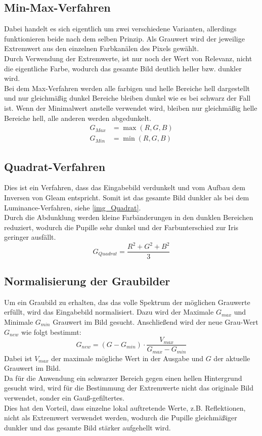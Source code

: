 \subsection{Min-Max-Verfahren}
\label{gray_MinMax}
Dabei handelt es sich eigentlich um zwei verschiedene Varianten, allerdings funktionieren beide nach dem selben Prinzip. Als Grauwert wird der jeweilige Extremwert aus den einzelnen Farbkanälen des Pixels gewählt.\\
Durch Verwendung der Extremwerte, ist nur noch der Wert von Relevanz, nicht die eigentliche Farbe, wodurch das gesamte Bild deutlich heller bzw. dunkler wird.\\
Bei dem Max-Verfahren werden alle farbigen und helle Bereiche hell dargestellt und nur gleichmäßig dunkel Bereiche bleiben dunkel wie es bei schwarz der Fall ist. Wenn der Minimalwert anstelle verwendet wird, bleiben nur gleichmäßig helle Bereiche hell, alle anderen werden abgedunkelt.
\begin{align*}
G_{Max} &= \max(R,G,B)\\
G_{Min} &= \min(R,G,B)
\end{align*}
\subsection{Quadrat-Verfahren}
\label{gray_Quadrat}
Dies ist ein Verfahren, dass das Eingabebild verdunkelt und vom Aufbau dem Inversen von Gleam entspricht. Somit ist das gesamte Bild dunkler als bei dem Luminance-Verfahren, siehe \autoref{img_Quadrat}.\\
Durch die Abdunklung werden kleine Farbänderungen in den dunklen Bereichen reduziert, wodurch die Pupille sehr dunkel und der Farbunterschied zur Iris geringer ausfällt.
\[G_{Quadrat}=\dfrac{R^2+G^2+B^2}{3}\]
\subsection{Normalisierung der Graubilder}
Um ein Graubild zu erhalten, das das volle Spektrum der möglichen Grauwerte erfüllt, wird das Eingabebild normalisiert. Dazu wird der Maximale $G_{max}$ und Minimale $G_{min}$ Grauwert im Bild gesucht. Anschließend wird der neue Grau-Wert $G_{new}$ wie folgt bestimmt:
\[G_{new} = (G-G_{min})\cdot \dfrac{V_{max}}{G_{max}-G_{min}}\]
Dabei ist $V_{max}$ der maximale mögliche Wert in der Ausgabe und $G$ der aktuelle Grauwert im Bild.\\
Da für die Anwendung ein schwarzer Bereich gegen einen hellen Hintergrund gesucht wird, wird für die Bestimmung der Extremwerte nicht das originale Bild verwendet, sonder ein Gauß-gefiltertes.\\
Dies hat den Vorteil, dass einzelne lokal auftretende Werte, z.B. Reflektionen, nicht als Extremwert verwendet werden, wodurch die Pupille gleichmäßiger dunkler und das gesamte Bild stärker aufgehellt wird.
